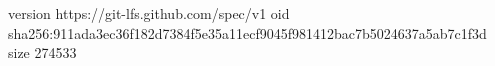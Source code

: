 version https://git-lfs.github.com/spec/v1
oid sha256:911ada3ec36f182d7384f5e35a11ecf9045f981412bac7b5024637a5ab7c1f3d
size 274533
